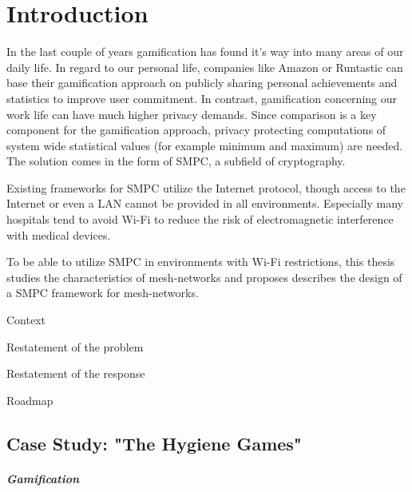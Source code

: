 \printnoidxglossary[type=\acronymtype,title={List of Acronyms}]

{\let\clearpage\relax \printnoidxglossary[type=symbols,sort=letter]}

\chapter{Introduction}
\label{Introduction}


In the last couple of years gamification has found it's way into many areas of our daily life. In regard to our personal life, companies like Amazon or Runtastic can base their gamification approach on publicly sharing personal achievements and statistics to improve user commitment. In contrast, gamification concerning our work life can have much higher privacy demands. Since comparison is a key component for the gamification approach, privacy protecting computations of system wide statistical values (for example minimum and maximum) are needed. The solution comes in the form of \gls{SMPC}, a subfield of cryptography.

Existing frameworks for \gls{SMPC} utilize the Internet protocol, though access to the Internet or even a \gls{LAN} cannot be provided in all environments. Especially many hospitals tend to avoid Wi-Fi to reduce the risk of electromagnetic interference with medical devices.

To be able to utilize \gls{SMPC} in environments with Wi-Fi restrictions, this thesis studies the characteristics of mesh-networks and proposes describes the design of a \gls{SMPC} framework for mesh-networks.

Context


Restatement of the problem

Restatement of the response

Roadmap

	\section{Case Study: "The Hygiene Games"}
	\label{Case Study: "The Hygiene Games"}

		\paragraph{Gamification}
	
